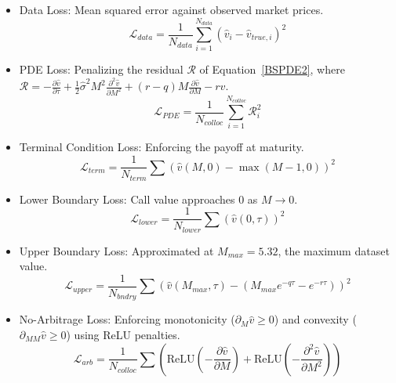 \documentclass[a4paper,fleqn]{cas-sc}
\begin{document}
\begin{itemize}[nosep]
    \item {Data Loss:} Mean squared error against observed market prices.
    \begin{equation}
    \mathcal{L}_{data}=\frac{1}{N_{data}}\sum_{i=1}^{N_{data}}\left(\hat{v}_i-\hat{v}_{true,i}\right)^2
    \end{equation}
    
    \item {PDE Loss:} Penalizing the residual $\mathcal{R}$ of Equation~\ref{BSPDE2}, where $\mathcal{R}= -\frac{\partial \hat{v}}{\partial \tau} +\frac{1}{2}\hat{\sigma}^2 M^2\frac{\partial^2\hat{v}}{\partial M^2} +(r-q)M\frac{\partial \hat{v}}{\partial M} -r\hat{v}$.
    \begin{equation}
    \mathcal{L}_{PDE}=\frac{1}{N_{colloc}}\sum_{i=1}^{N_{colloc}}\mathcal{R}_i^2
    \end{equation}
    
    \item {Terminal Condition Loss:} Enforcing the payoff at maturity.
    \begin{equation}
    \mathcal{L}_{term} = \frac{1}{N_{term}}\sum \left(\hat{v}(M,0)-\max(M-1,0)\right)^2
    \end{equation}
    
    \item {Lower Boundary Loss:} Call value approaches 0 as $M \to 0$.
    \begin{equation}
    \mathcal{L}_{lower}=\frac{1}{N_{lower}}\sum \left(\hat{v}(0,\tau)\right)^2
    \end{equation}
    
    \item {Upper Boundary Loss:} Approximated at $M_{max}=5.32$, the maximum dataset value. 
    \begin{equation}
    \mathcal{L}_{upper}=\frac{1}{N_{bndry}}\sum\left(\hat{v}(M_{max},\tau) - \left(M_{max}e^{-q\tau}-e^{-r\tau}\right)\right)^2
    \end{equation}
    
    \item {No-Arbitrage Loss:} Enforcing monotonicity ($\partial_M \hat{v} \ge 0$) and convexity ($\partial_{MM}\hat{v} \ge 0$) using ReLU penalties.
    \begin{equation}
    \mathcal{L}_{arb} =\frac{1}{N_{colloc}}\sum \left( \mathrm{ReLU}\left(-\frac{\partial \hat{v}}{\partial M}\right) + \mathrm{ReLU}\left(-\frac{\partial^2 \hat{v}}{\partial M^2}\right) \right)
    \end{equation}
\end{itemize}
\end{document}
